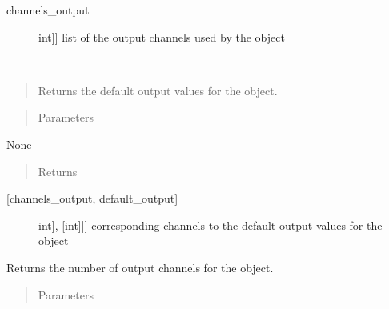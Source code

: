 \documentclass[letterpaper,10pt,english]{sphinxmanual}
\begin{document}
\begin{fulllineitems}
\begin{fulllineitems}
\begin{description}
\item[{channels\_output}] \leavevmode{[}{[}int{]}{]}
\sphinxAtStartPar
list of the output channels used by the object

\end{description}

\end{fulllineitems}


\begin{fulllineitems}
\label{\detokenize{generic:DigitalOutputObject.DigitalOutputObject.get_default_outputs}}~\begin{quote}

\sphinxAtStartPar
Returns the default output values for the object.
\end{quote}
\begin{quote}\begin{description}
\item[{Parameters}] \leavevmode
\end{description}\end{quote}

\sphinxAtStartPar
None
\begin{quote}\begin{description}
\item[{Returns}] \leavevmode
\end{description}\end{quote}
\begin{description}
\item[{{[}channels\_output, default\_output{]}}] \leavevmode{[}{[}{[}int{]}, {[}int{]}{]}{]}
\sphinxAtStartPar
corresponding channels to the default output values for the object

\end{description}

\end{fulllineitems}


\begin{fulllineitems}
\label{\detokenize{generic:DigitalOutputObject.DigitalOutputObject.get_num_channels}}
\sphinxAtStartPar
Returns the number of output channels for the object.
\begin{quote}\begin{description}
\item[{Parameters}] \leavevmode
\end{description}\end{quote}


\end{fulllineitems}
\end{fulllineitems}
\end{document}
